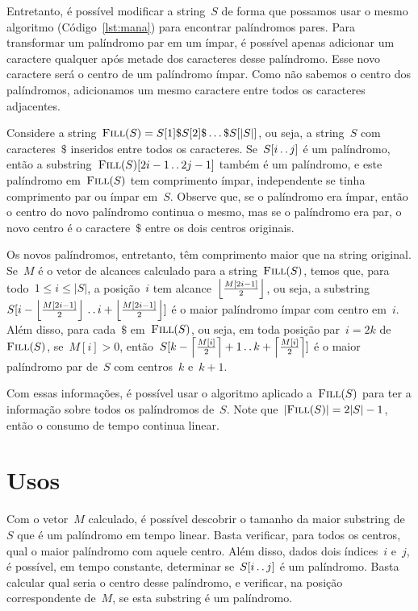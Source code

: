 Entretanto, é possível modificar a string~$S$ de forma que possamos usar o mesmo algoritmo (Código~\ref{lst:mana}) para encontrar palíndromos pares. Para transformar um palíndromo par em um ímpar, é possível apenas adicionar um caractere qualquer após metade dos caracteres desse palíndromo. Esse novo caractere será o centro de um palíndromo ímpar. Como não sabemos o centro dos palíndromos, adicionamos um mesmo caractere entre todos os caracteres adjacentes.

Considere a string~$\textsc{Fill}(S) = S[1]\$S[2]\$\ldots\$S[|S|]$, ou seja, a string~$S$ com caracteres~$\$$ inseridos entre todos os caracteres. Se~$S[i \,.\,.\, j]$ é um palíndromo, então a substring~${\textsc{Fill}(S)[2i-1 \,.\,.\, 2j-1]}$ também é um palíndromo, e este palíndromo em~$\textsc{Fill}(S)$ tem comprimento ímpar, independente se tinha comprimento par ou ímpar em~$S$. Observe que, se o palíndromo era ímpar, então o centro do novo palíndromo continua o mesmo, mas se o palíndromo era par, o novo centro é o caractere~$\$$ entre os dois centros originais.

Os novos palíndromos, entretanto, têm comprimento maior que na string original. Se~$M$ é o vetor de alcances calculado para a string~$\textsc{Fill}(S)$, temos que, para todo~$1 \leq i \leq |S|$, a posição~$i$ tem alcance~${\left \lfloor \frac{M[2i-1]}{2} \right \rfloor}$, ou seja, a substring~${S[i - \left \lfloor \frac{M[2i-1]}{2} \right \rfloor\,.\,.\, i + \left \lfloor \frac{M[2i-1]}{2} \right \rfloor]}$ é o maior palíndromo ímpar com centro em~$i$. Além disso, para cada~$\$$ em~$\textsc{Fill}(S)$, ou seja, em toda posição par~$i = 2k$ de~$\textsc{Fill}(S)$, se~${M[i] > 0}$, então~${S[k - \left \lceil \frac{M[i]}{2} \right \rceil + 1 \,.\,.\, k + \left \lceil \frac{M[i]}{2} \right \rceil]}$ é o maior palíndromo par de~$S$ com centros~$k$ e~${k + 1}$.

Com essas informações, é possível usar o algoritmo aplicado a~$\textsc{Fill}(S)$ para ter a informação sobre todos os palíndromos de~$S$. Note que~$|\textsc{Fill}(S)| = 2|S| - 1$, então o consumo de tempo continua linear.

\section{Usos}
Com o vetor~$M$ calculado, é possível descobrir o tamanho da maior substring de~$S$ que é um palíndromo em tempo linear. Basta verificar, para todos os centros, qual o maior palíndromo com aquele centro. Além disso, dados dois índices~$i$ e~$j$, é possível, em tempo constante, determinar se~$S[i\,.\,.\, j]$ é um palíndromo. Basta calcular qual seria o centro desse palíndromo, e verificar, na posição correspondente de~$M$, se esta substring é um palíndromo.